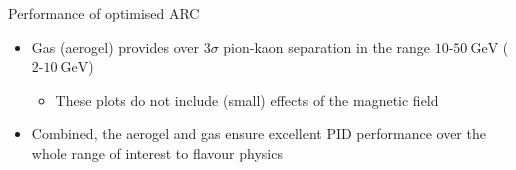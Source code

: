 \documentclass{beamer}
\begin{document}
\begin{frame}{Performance of optimised ARC}
\begin{figure}
  \end{figure}
  \vspace{-0.4cm}
  \begin{itemize}
    \setlength\itemsep{0.0em}
    \item{Gas (aerogel) provides over $3\sigma$ pion-kaon separation in the range $10$-$\SI{50}{\giga\eV}$ ($2$-$\SI{10}{\giga\eV}$)}
    \begin{itemize}
      \item{These plots do not include (small) effects of the magnetic field}
    \end{itemize}
    \item{Combined, the aerogel and gas ensure excellent PID performance over the whole range of interest to flavour physics}
  \end{itemize}
\end{frame}
\end{document}
